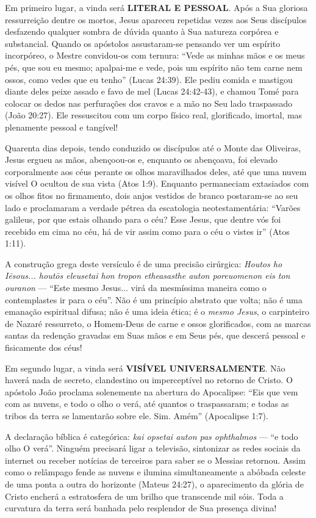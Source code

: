 Em primeiro lugar, a vinda será \textbf{LITERAL E PESSOAL}.
Após a Sua gloriosa ressurreição dentre os mortos, Jesus apareceu repetidas vezes aos Seus discípulos desfazendo qualquer sombra de dúvida quanto à Sua natureza corpórea e substancial. Quando os apóstolos assustaram-se pensando ver um espírito incorpóreo, o Mestre convidou-os com ternura: ``Vede as minhas mãos e os meus pés, que sou eu mesmo; apalpai-me e vede, pois um espírito não tem carne nem ossos, como vedes que eu tenho'' (Lucas 24:39). Ele pediu comida e mastigou diante deles peixe assado e favo de mel (Lucas 24:42-43), e chamou Tomé para colocar os dedos nas perfurações dos cravos e a mão no Seu lado traspassado (João 20:27). Ele ressuscitou com um corpo físico real, glorificado, imortal, mas plenamente pessoal e tangível!

Quarenta dias depois, tendo conduzido os discípulos até o Monte das Oliveiras, Jesus ergueu as mãos, abençoou-os e, enquanto os abençoava, foi elevado corporalmente aos céus perante os olhos maravilhados deles, até que uma nuvem visível O ocultou de sua vista (Atos 1:9). Enquanto permaneciam extasiados com os olhos fitos no firmamento, dois anjos vestidos de branco postaram-se ao seu lado e proclamaram a verdade pétrea da escatologia neotestamentária:
``Varões galileus, por que estais olhando para o céu? Esse Jesus, que dentre vós foi recebido em cima no céu, há de vir assim como para o céu o vistes ir'' (Atos 1:11).

A construção grega deste versículo é de uma precisão cirúrgica:
\textit{Houtos ho Iēsous... houtōs eleusetai hon tropon etheasasthe auton poreuomenon eis ton ouranon} — ``Este mesmo Jesus... virá da mesmíssima maneira como o contemplastes ir para o céu''.
Não é um princípio abstrato que volta; não é uma emanação espiritual difusa; não é uma ideia ética; é o \textit{mesmo Jesus}, o carpinteiro de Nazaré ressurreto, o Homem-Deus de carne e ossos glorificados, com as marcas santas da redenção gravadas em Suas mãos e em Seus pés, que descerá pessoal e fisicamente dos céus!

Em segundo lugar, a vinda será \textbf{VISÍVEL UNIVERSALMENTE}.
Não haverá nada de secreto, clandestino ou imperceptível no retorno de Cristo. O apóstolo João proclama solenemente na abertura do Apocalipse:
``Eis que vem com as nuvens, e todo o olho o verá, até quantos o traspassaram; e todas as tribos da terra se lamentarão sobre ele. Sim. Amém'' (Apocalipse 1:7).

A declaração bíblica é categórica: \textit{kai opsetai auton pas ophthalmos} — ``e todo olho O verá''. Ninguém precisará ligar a televisão, sintonizar as redes sociais da internet ou receber notícias de terceiros para saber se o Messias retornou. Assim como o relâmpago fende as nuvens e ilumina simultaneamente a abóbada celeste de uma ponta a outra do horizonte (Mateus 24:27), o aparecimento da glória de Cristo encherá a estratosfera de um brilho que transcende mil sóis. Toda a curvatura da terra será banhada pelo resplendor de Sua presença divina!

